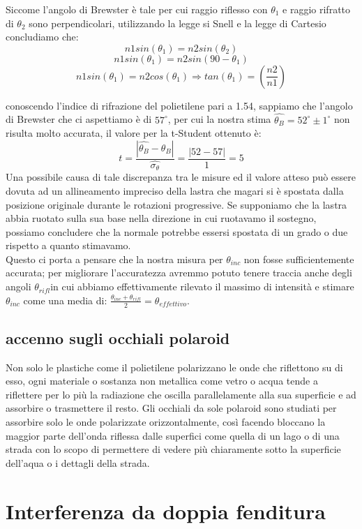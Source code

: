 \documentclass{article}
\theoremstyle{definition}
\begin{document}
\noindent Siccome l'angolo di Brewster è tale per cui raggio riflesso con \(\theta_{1}\) e raggio rifratto di \(\theta_{2}\) sono perpendicolari, utilizzando la legge si Snell e la legge di Cartesio concludiamo che:
\[n1 sin(\theta_{1}) = n2 sin(\theta_{2})\]
\[n1 sin(\theta_{1}) = n2 sin(90 - \theta_{1})\]
\[n1 sin(\theta_{1}) = n2 cos(\theta_{1})  \Rightarrow tan(\theta_{1})=\left(\frac{n2}{n1}\right)\]

\noindent conoscendo l'indice di rifrazione del polietilene pari a 1.54, sappiamo che l'angolo di Brewster che ci aspettiamo è di \(57^{\circ}\), per cui la nostra stima \(\hat{\theta_{B}}=52^{\circ}\pm 1^{\circ}\) non risulta molto accurata, il valore per la t-Student ottenuto è:
\[t = \frac{\left| \hat{\theta_{B}} - \theta_{B}\right|}{\hat{\sigma_{\theta}}} = \frac{\left|52 - 57\right|}{1} = 5\]
Una possibile causa di tale discrepanza tra le misure ed il valore atteso può essere dovuta ad un allineamento impreciso della lastra che magari si è spostata dalla posizione originale durante le rotazioni progressive. Se supponiamo che la lastra abbia ruotato sulla sua base nella direzione in cui ruotavamo il sostegno, possiamo concludere che la normale potrebbe essersi spostata di un grado o due rispetto a quanto stimavamo.\\
Questo ci porta a pensare che la nostra misura per \(\theta_{inc}\) non fosse sufficientemente accurata; per migliorare l'accuratezza avremmo potuto tenere traccia anche degli angoli \(\theta_{rifl}\)in cui abbiamo effettivamente rilevato il massimo di intensità e stimare \(\theta_{inc}\) come una media di: \(\frac{\theta_{inc} + \theta_{rifl}}{2} = \theta_{ effettivo}\).

\subsection{accenno sugli occhiali polaroid}
Non solo le plastiche come il polietilene polarizzano le onde che riflettono su di esso, ogni materiale o sostanza non metallica come vetro o acqua tende a riflettere per lo più la radiazione che oscilla parallelamente alla sua superficie e ad assorbire o trasmettere il resto. Gli occhiali da sole polaroid sono studiati per assorbire solo le onde polarizzate orizzontalmente, così facendo bloccano la maggior parte dell'onda riflessa dalle superfici come quella di un lago o di una strada con lo scopo di permettere di vedere più chiaramente sotto la superficie dell'aqua o i dettagli della strada.

\section{Interferenza da doppia fenditura}%
\end{document}
